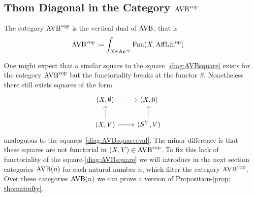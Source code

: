 

\subsection{Thom Diagonal in the Category $\operatorname{AVB}^{\mathrm{vop}}$}

\begin{definition}
    The category $\operatorname{AVB}^{\mathrm{vop}}$ is the vertical dual of $\operatorname{AVB}$, that is 
    \[
      \operatorname{AVB}^{\mathrm{vop}} := \int_{X \in \operatorname{An}^{\mathrm{op}}} \operatorname{Fun}(X, \operatorname{AffLin}^{\mathrm{op}})  
    \]
\end{definition}

\begin{remark}
    One might expect that a similar square to the square~\ref{diag:AVBsquare} exists 
    for the category $\operatorname{AVB}^{\mathrm{vop}}$ but the functoriality breaks at the functor $S$.
    Nonetheless there still exists squares of the form 
    \[\begin{tikzcd}
        {(X,\emptyset)} & {(X,0)} \\
        {(X,V)} & {(S^V,V)}
        \arrow[from=2-1, to=1-1]
        \arrow[from=1-1, to=1-2]
        \arrow[from=2-1, to=2-2]
        \arrow[from=2-2, to=1-2]
    \end{tikzcd}\]
    analoguous to the squares~\ref{diag:AVBsquareeval}. The minor difference is that these 
    squares are not functorial in $(X,V) \in \operatorname{AVB}^{\mathrm{vop}}$.
    To fix this lack of functoriality of the square-\ref{diag:AVBsquare} we will 
    introduce in the next section categories $\operatorname{AVB}(n)$ for each natural number $n$, 
    which filter the category $\operatorname{AVB}^{\mathrm{vop}}$.
    Over these categories $\operatorname{AVB}(n)$ we can prove a version of Proposition-\ref{prop: thomatinfty}.
\end{remark}

